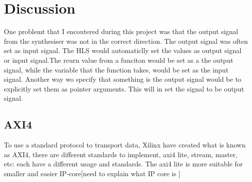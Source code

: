 \chapter{Discussion} \label{discussion}

One problemt that I encoutered during this project was that the output signal from the synthesiser was not in the correct direction. The output signal was often set as input signal. The HLS would automaticlly set the values as output signal or input signal.The reurn value from a funciton would be set as a the output signal, while the variable that the function takes, would be set as the input signal. Another way wo specify that something is the output signal would be to explicitly set them as pointer arguments. This will in set the signal to be output signal.

\section{AXI4}
To use a standard protocol to transport data, Xilinx have created what is known as AXI4, there are different standards to implement, axi4 lite, stream, master, etc: each have a different usage and standards. The axi4 lite is more suitable for smaller and easier IP-core[need to explain what IP core is ]
